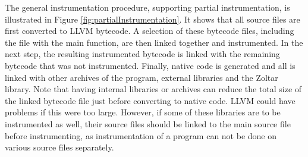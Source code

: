 The general instrumentation procedure,
supporting partial instrumentation,
is illustrated in Figure \ref{fig:partialInstrumentation}.
It shows that all source files are first
converted to LLVM bytecode.
A selection of these bytecode files,
including the file with the main function,
are then linked together and instrumented.
In the next step, the resulting instrumented bytecode
is linked with the remaining bytecode
that was not instrumented.
Finally, native code is generated and all is
linked with other archives of the program,
external libraries and the Zoltar library.
Note that having internal libraries or archives
can reduce the total size of the linked bytecode
file just before converting to native code.
LLVM could have problems if this were too large.
However, if some of these libraries are to be
instrumented as well, their source files should
be linked to the main source file before instrumenting,
as instrumentation of a program can not be done
on various source files separately.


